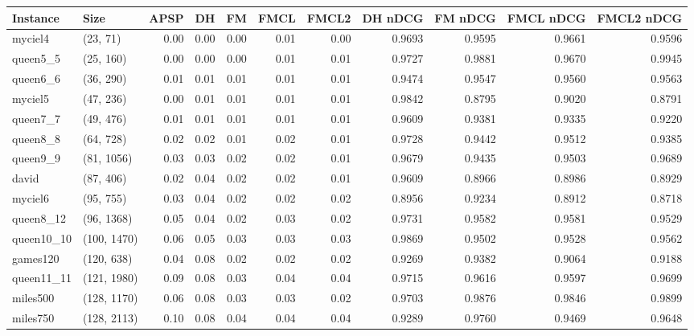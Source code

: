\begin{tabular}{llrrrrrrrrr}
\toprule
  Instance &         Size &  APSP &   DH &   FM &  FMCL &  FMCL2 &  DH nDCG &  FM nDCG &  FMCL nDCG &  FMCL2 nDCG \\
\midrule
   myciel4 &     (23, 71) &  0.00 & 0.00 & 0.00 &  0.01 &   0.00 &   0.9693 &   0.9595 &     0.9661 &      0.9596 \\
  queen5\_5 &    (25, 160) &  0.00 & 0.00 & 0.00 &  0.01 &   0.01 &   0.9727 &   0.9881 &     0.9670 &      0.9945 \\
  queen6\_6 &    (36, 290) &  0.01 & 0.01 & 0.01 &  0.01 &   0.01 &   0.9474 &   0.9547 &     0.9560 &      0.9563 \\
   myciel5 &    (47, 236) &  0.00 & 0.01 & 0.01 &  0.01 &   0.01 &   0.9842 &   0.8795 &     0.9020 &      0.8791 \\
  queen7\_7 &    (49, 476) &  0.01 & 0.01 & 0.01 &  0.01 &   0.01 &   0.9609 &   0.9381 &     0.9335 &      0.9220 \\
  queen8\_8 &    (64, 728) &  0.02 & 0.02 & 0.01 &  0.02 &   0.01 &   0.9728 &   0.9442 &     0.9512 &      0.9385 \\
  queen9\_9 &   (81, 1056) &  0.03 & 0.03 & 0.02 &  0.02 &   0.01 &   0.9679 &   0.9435 &     0.9503 &      0.9689 \\
     david &    (87, 406) &  0.02 & 0.04 & 0.02 &  0.02 &   0.01 &   0.9609 &   0.8966 &     0.8986 &      0.8929 \\
   myciel6 &    (95, 755) &  0.03 & 0.04 & 0.02 &  0.02 &   0.02 &   0.8956 &   0.9234 &     0.8912 &      0.8718 \\
 queen8\_12 &   (96, 1368) &  0.05 & 0.04 & 0.02 &  0.03 &   0.02 &   0.9731 &   0.9582 &     0.9581 &      0.9529 \\
queen10\_10 &  (100, 1470) &  0.06 & 0.05 & 0.03 &  0.03 &   0.03 &   0.9869 &   0.9502 &     0.9528 &      0.9562 \\
  games120 &   (120, 638) &  0.04 & 0.08 & 0.02 &  0.02 &   0.02 &   0.9269 &   0.9382 &     0.9064 &      0.9188 \\
queen11\_11 &  (121, 1980) &  0.09 & 0.08 & 0.03 &  0.04 &   0.04 &   0.9715 &   0.9616 &     0.9597 &      0.9699 \\
  miles500 &  (128, 1170) &  0.06 & 0.08 & 0.03 &  0.03 &   0.02 &   0.9703 &   0.9876 &     0.9846 &      0.9899 \\
  miles750 &  (128, 2113) &  0.10 & 0.08 & 0.04 &  0.04 &   0.04 &   0.9289 &   0.9760 &     0.9469 &      0.9648 \\

\end{tabular}
